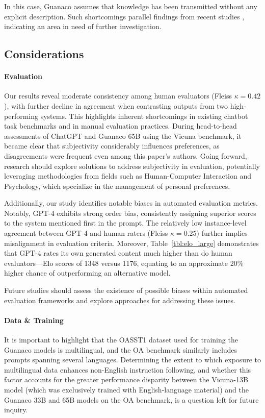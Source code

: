 In this case, {Guanaco} assumes that knowledge has been transmitted without any explicit description. Such shortcomings parallel findings from recent studies \cite{sap2022neural}, indicating an area in need of further investigation.

\subsection{Considerations}
\label{ssec:considerations}

\paragraph{Evaluation}

Our results reveal moderate consistency among human evaluators (Fleiss $\kappa=0.42$), with further decline in agreement when contrasting outputs from two high-performing systems. This highlights inherent shortcomings in existing chatbot task benchmarks and in manual evaluation practices. During head-to-head assessments of ChatGPT and {Guanaco} 65B using the Vicuna benchmark, it became clear that subjectivity considerably influences preferences, as disagreements were frequent even among this paper's authors. Going forward, research should explore solutions to address subjectivity in evaluation, potentially leveraging methodologies from fields such as Human-Computer Interaction and Psychology, which specialize in the management of personal preferences.

Additionally, our study identifies notable biases in automated evaluation metrics. Notably, GPT-4 exhibits strong order bias, consistently assigning superior scores to the system mentioned first in the prompt. The relatively low instance-level agreement between GPT-4 and human raters (Fleiss $\kappa=0.25$) further implies misalignment in evaluation criteria. Moreover, Table~\ref{tbl:elo_large} demonstrates that GPT-4 rates its own generated content much higher than do human evaluators—Elo scores of 1348 versus 1176, equating to an approximate 20\% higher chance of outperforming an alternative model.

Future studies should assess the existence of possible biases within automated evaluation frameworks and explore approaches for addressing these issues.

\paragraph{Data \& Training} It is important to highlight that the OASST1 dataset used for training the {Guanaco} models is multilingual, and the OA benchmark similarly includes prompts spanning several languages. Determining the extent to which exposure to multilingual data enhances non-English instruction following, and whether this factor accounts for the greater performance disparity between the Vicuna-13B model (which was exclusively trained with English-language material) and the {Guanaco} 33B and 65B models on the OA benchmark, is a question left for future inquiry.

